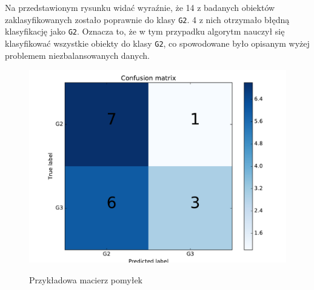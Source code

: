 Na przedstawionym rysunku widać wyraźnie, że 14 z badanych obiektów zaklasyfikowanych zostało poprawnie do klasy \texttt{G2}. 4 z nich otrzymało błędną klasyfikację jako \texttt{G2}. Oznacza to, że w tym przypadku algorytm nauczył się klasyfikować wszystkie obiekty do klasy \texttt{G2}, co spowodowane było opisanym wyżej problemem niezbalansowanych danych.

\begin{figure}[h!]
	\centering
	\includegraphics[width=0.8\linewidth]{img/conf_matrix.pdf}
	\label{Rysunek}
	\caption{Przykładowa macierz pomyłek}
\end{figure}
